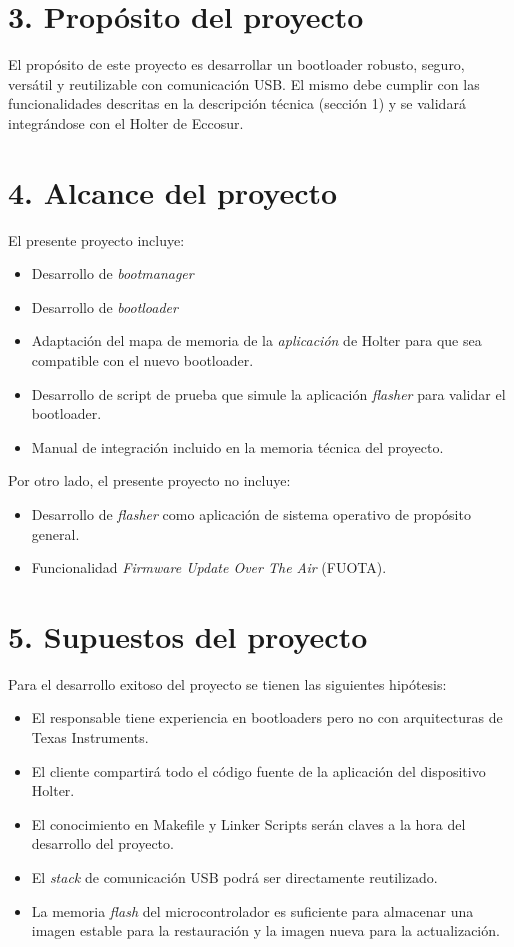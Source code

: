 \documentclass[
11pt, %
]{charter}
\begin{document}
\section{3. Propósito del proyecto}
\label{sec:proposito}

El propósito de este proyecto es desarrollar un bootloader robusto, seguro, versátil y reutilizable con comunicación USB. El mismo debe cumplir con las funcionalidades descritas en la descripción técnica (sección 1) y se validará integrándose con el Holter de Eccosur.

\section{4. Alcance del proyecto}
\label{sec:alcance}

El presente proyecto incluye:

\begin{itemize}
	\item Desarrollo de \textit{bootmanager}
	\item Desarrollo de \textit{bootloader}
	\item Adaptación del mapa de memoria de la \textit{aplicación} de Holter para que sea compatible con el nuevo bootloader.
	\item Desarrollo de script de prueba que simule la aplicación \textit{flasher} para validar el bootloader.
	\item Manual de integración incluido en la memoria técnica del proyecto.
\end{itemize}

Por otro lado, el presente proyecto no incluye:

\begin{itemize}
	\item Desarrollo de \textit{flasher} como aplicación de sistema operativo de propósito general.
	\item Funcionalidad \textit{Firmware Update Over The Air} (FUOTA).
\end{itemize}

\section{5. Supuestos del proyecto}
\label{sec:supuestos}

Para el desarrollo exitoso del proyecto se tienen las siguientes hipótesis:

\begin{itemize}
	\item El responsable tiene experiencia en bootloaders pero no con arquitecturas de Texas Instruments.
	\item El cliente compartirá todo el código fuente de la aplicación del dispositivo Holter.
	\item El conocimiento en Makefile y Linker Scripts serán claves a la hora del desarrollo del proyecto.
	\item El \textit{stack} de comunicación USB podrá ser directamente reutilizado.
	\item La memoria \textit{flash} del microcontrolador es suficiente para almacenar una imagen estable para la restauración y la imagen nueva para la actualización.
\end{itemize}
\end{document}

